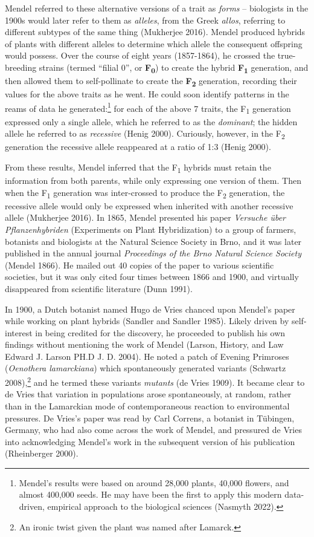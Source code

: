\documentclass[
]{book}
\begin{document}
Mendel referred to these alternative versions of a trait as \emph{forms} -- biologists in the 1900s would later refer to them as \emph{alleles}, from the Greek \emph{allos}, referring to different subtypes of the same thing (Mukherjee 2016). Mendel produced hybrids of plants with different alleles to determine which allele the consequent offspring would possess. Over the course of eight years (1857-1864), he crossed the true-breeding strains (termed ``filial 0'', or \textbf{F\textsubscript{0}}) to create the hybrid \textbf{F\textsubscript{1}} generation, and then allowed them to self-pollinate to create the \textbf{F\textsubscript{2}} generation, recording their values for the above traits as he went. He could soon identify patterns in the reams of data he generated:\footnote{Mendel's results were based on around 28,000 plants, 40,000 flowers, and almost 400,000 seeds. He may have been the first to apply this modern data-driven, empirical approach to the biological sciences (Nasmyth 2022).} for each of the above 7 traits, the F\textsubscript{1} generation expressed only a single allele, which he referred to as the \emph{dominant}; the hidden allele he referred to as \emph{recessive} (Henig 2000). Curiously, however, in the F\textsubscript{2} generation the recessive allele reappeared at a ratio of 1:3 (Henig 2000).

From these results, Mendel inferred that the F\textsubscript{1} hybrids must retain the information from both parents, while only expressing one version of them. Then when the F\textsubscript{1} generation was inter-crossed to produce the F\textsubscript{2} generation, the recessive allele would only be expressed when inherited with another recessive allele (Mukherjee 2016). In 1865, Mendel presented his paper \emph{Versuche über Pflanzenhybriden} (Experiments on Plant Hybridization) to a group of farmers, botanists and biologists at the Natural Science Society in Brno, and it was later published in the annual journal \emph{Proceedings of the Brno Natural Science Society} (Mendel 1866). He mailed out 40 copies of the paper to various scientific societies, but it was only cited four times between 1866 and 1900, and virtually disappeared from scientific literature (Dunn 1991).

In 1900, a Dutch botanist named Hugo de Vries chanced upon Mendel's paper while working on plant hybrids (Sandler and Sandler 1985). Likely driven by self-interest in being credited for the discovery, he proceeded to publish his own findings without mentioning the work of Mendel (Larson, History, and Law Edward J. Larson PH.D J. D. 2004). He noted a patch of Evening Primroses (\emph{Oenothera lamarckiana}) which spontaneously generated variants (Schwartz 2008),\footnote{An ironic twist given the plant was named after Lamarck.} and he termed these variants \emph{mutants} (de Vries 1909). It became clear to de Vries that variation in populations arose spontaneously, at random, rather than in the Lamarckian mode of contemporaneous reaction to environmental pressures. De Vries's paper was read by Carl Correns, a botanist in Tübingen, Germany, who had also come across the work of Mendel, and pressured de Vries into acknowledging Mendel's work in the subsequent version of his publication (Rheinberger 2000).
\end{document}
